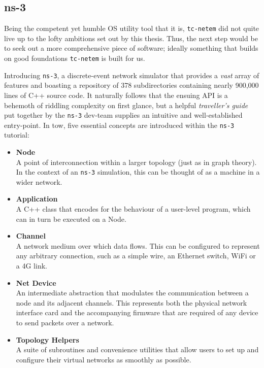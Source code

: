 \subsection{ns-3}

Being the competent yet humble OS utility tool that it is, \texttt{tc-netem} did not quite live up to the lofty
ambitions set out by this thesis. Thus, the next step would be to seek out a more comprehensive piece of software;
ideally something that builds on good foundations \texttt{tc-netem} is built for us.

Introducing \texttt{ns-3}, a discrete-event network simulator that provides a \emph{vast} array of
features\cite{ns_3_man} and boasting a repository of 378 subdirectories containing nearly 900,000 lines of C++ source
code\cite{ns_3_gitlab}. It naturally follows that the ensuing API is a behemoth of riddling complexity on first
glance, but a helpful \emph{traveller's guide} put together by the \texttt{ns-3} dev-team supplies an intuitive and
well-established entry-point\cite{ns_3_man_pdf}. In tow, five essential concepts are introduced within the \texttt{ns-3}
tutorial:
\begin{itemize}
    \item \textbf{Node} \\
    A point of interconnection within a larger topology (just as in graph theory). In the context of an \texttt{ns-3}
    simulation, this can be thought of as a machine in a wider network.
    \item \textbf{Application} \\
    A C++ class that encodes for the behaviour of a user-level program, which can in turn be executed on a Node.
    \item \textbf{Channel} \\
    A network medium over which data flows. This can be configured to represent any arbitrary connection, such as a
    simple wire, an Ethernet switch, WiFi or a 4G link.
    \item \textbf{Net Device} \\
    An intermediate abstraction that modulates the communication between a node and its adjacent channels. This
    represents both the physical network interface card and the accompanying firmware that are required of any device
    to send packets over a network.
    \item \textbf{Topology Helpers} \\
    A suite of subroutines and convenience utilities that allow users to set up and configure their virtual networks
    as smoothly as possible.
\end{itemize}

